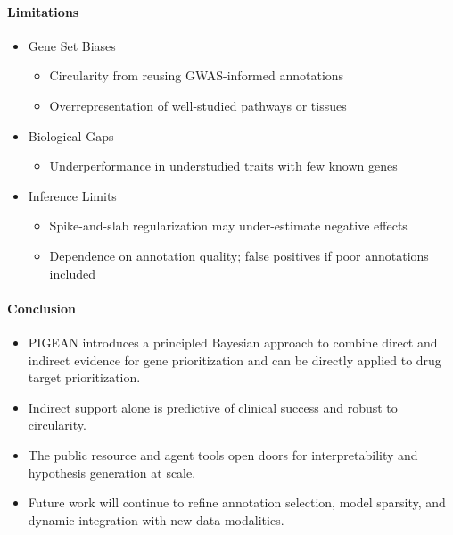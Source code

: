 \documentclass[sn-nature,lineno]{sn-jnl}%
\theoremstyle{thmstyleone}%
\theoremstyle{thmstyletwo}%
\theoremstyle{thmstylethree}%
\begin{document}
\paragraph{Limitations}
\begin{itemize}
    \item Gene Set Biases
    \begin{itemize}
        \item Circularity from reusing GWAS-informed annotations
        \item Overrepresentation of well-studied pathways or tissues
    \end{itemize}
    \item Biological Gaps
    \begin{itemize}
        \item Underperformance in understudied traits with few known genes
    \end{itemize}    
    \item Inference Limits
    \begin{itemize}
        \item Spike-and-slab regularization may under-estimate negative effects
        \item Dependence on annotation quality; false positives if poor annotations included
    \end{itemize}
\end{itemize}

\paragraph{Conclusion}
\begin{itemize}
    \item PIGEAN introduces a principled Bayesian approach to combine direct and indirect evidence for gene prioritization and can be directly applied to drug target prioritization. 
    \item Indirect support alone is predictive of clinical success and robust to circularity.
    \item The public resource and agent tools open doors for interpretability and hypothesis generation at scale.
    \item Future work will continue to refine annotation selection, model sparsity, and dynamic integration with new data modalities.
\end{itemize}

\newpage

\end{document}
